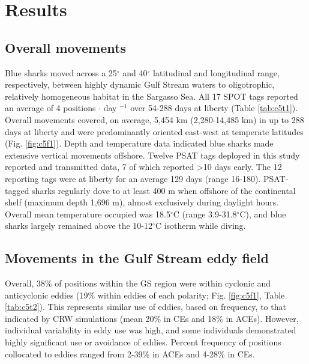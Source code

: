 \section{Results}

\subsection{Overall movements}

Blue sharks moved across a 25$^{\circ}$ and 40$^{\circ}$ latitudinal and longitudinal range, respectively, between highly dynamic Gulf Stream waters to oligotrophic, relatively homogeneous habitat in the Sargasso Sea. All 17 SPOT tags reported an average of 4 positions $\cdot$ day $^{-1}$ over 54-288 days at liberty (Table \ref{tab:c5t1}). Overall movements covered, on average, 5,454 km (2,280-14,485 km) in up to 288 days at liberty and were predominantly oriented east-west at temperate latitudes (Fig. \ref{fig:c5f1}). Depth and temperature data indicated blue sharks made extensive vertical movements offshore. Twelve PSAT tags deployed in this study reported and transmitted data, 7 of which reported >10 days early. The 12 reporting tags were at liberty for an average 129 days (range 16-180). PSAT-tagged sharks regularly dove to at least 400 m when offshore of the continental shelf (maximum depth 1,696 m), almost exclusively during daylight hours. Overall mean temperature occupied was 18.5$^\circ$C (range 3.9-31.8$^\circ$C), and blue sharks largely remained above the 10-12$^\circ$C isotherm while diving.

\subsection{Movements in the Gulf Stream eddy field}

Overall, 38\% of positions within the GS region were within cyclonic and anticyclonic eddies (19\% within eddies of each polarity; Fig. \ref{fig:c5f1}, Table \ref{tab:c5t2}). This represents similar use of eddies, based on frequency, to that indicated by CRW simulations (mean 20\% in CEs and 18\% in ACEs). However, individual variability in eddy use was high, and some individuals demonstrated highly significant use or avoidance of eddies. Percent frequency of positions collocated to eddies ranged from 2-39\% in ACEs and 4-28\% in CEs.

